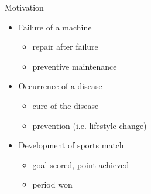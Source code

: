 \documentclass[american]{beamer}
\begin{document}
    \begin{frame}{Motivation}
        \begin{itemize}
            \item Failure of a machine
            \begin{itemize}
                \item repair after failure
                \item preventive maintenance
            \end{itemize}
            \item<2-> Occurrence of a disease
            \begin{itemize}
                \item cure of the disease
                \item prevention (i.e. lifestyle change)
            \end{itemize}
            \item<3-> Development of sports match
            \begin{itemize}
                \item goal scored, point achieved
                \item period won
            \end{itemize}
        \end{itemize}
    \end{frame}
\end{document}
